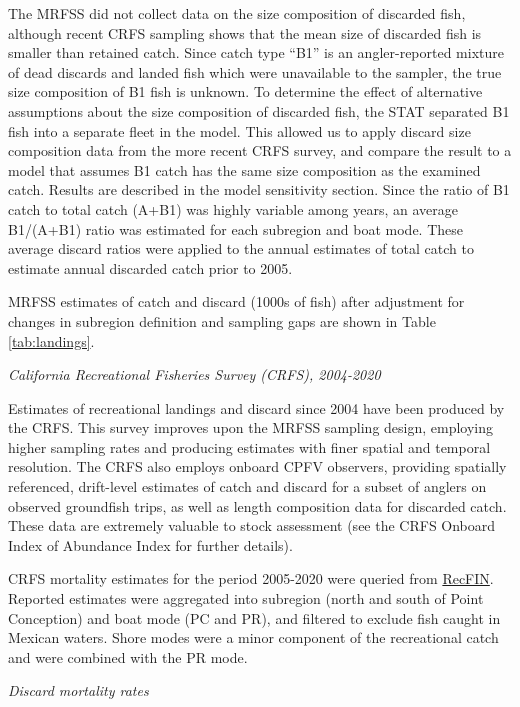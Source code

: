 \documentclass[11pt,
  english,
  a4paper,
]{article}
\begin{document}
The MRFSS did not collect data on the size composition of discarded fish, although recent CRFS sampling shows that the mean size of discarded fish is smaller than retained catch. Since catch type ``B1'' is an angler-reported mixture of dead discards and landed fish which were unavailable to the sampler, the true size composition of B1 fish is unknown. To determine the effect of alternative assumptions about the size composition of discarded fish, the STAT separated B1 fish into a separate fleet in the model. This allowed us to apply discard size composition data from the more recent CRFS survey, and compare the result to a model that assumes B1 catch has the same size composition as the examined catch. Results are described in the model sensitivity section. Since the ratio of B1 catch to total catch (A+B1) was highly variable among years, an average B1/(A+B1) ratio was estimated for each subregion and boat mode. These average discard ratios were applied to the annual estimates of total catch to estimate annual discarded catch prior to 2005.

MRFSS estimates of catch and discard (1000s of fish) after adjustment for changes in subregion definition and sampling gaps are shown in Table \ref{tab:landings}.

\emph{California Recreational Fisheries Survey (CRFS), 2004-2020}

Estimates of recreational landings and discard since 2004 have been produced by the CRFS. This survey improves upon the MRFSS sampling design, employing higher sampling rates and producing estimates with finer spatial and temporal resolution. The CRFS also employs onboard CPFV observers, providing spatially referenced, drift-level estimates of catch and discard for a subset of anglers on observed groundfish trips, as well as length composition data for discarded catch. These data are extremely valuable to stock assessment (see the CRFS Onboard Index of Abundance Index for further details).

CRFS mortality estimates for the period 2005-2020 were queried from {\href{www.recfin.org}{RecFIN}\leavevmode\tagmcend\tagstructend}. Reported estimates were aggregated into subregion (north and south of Point Conception) and boat mode (PC and PR), and filtered to exclude fish caught in Mexican waters. Shore modes were a minor component of the recreational catch and were combined with the PR mode.

\emph{Discard mortality rates}
\end{document}

